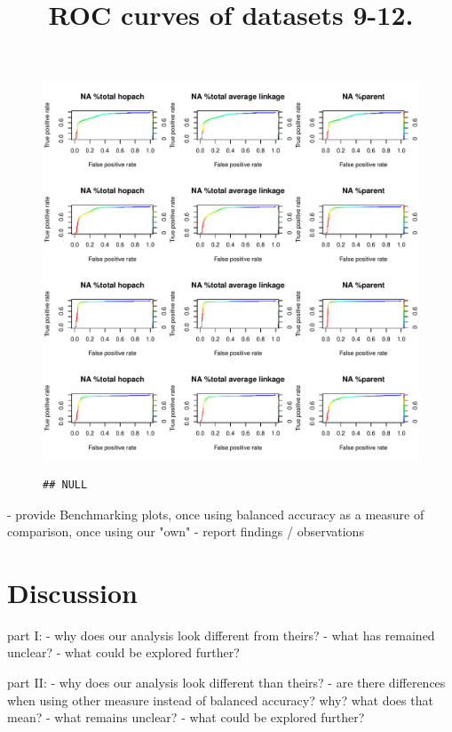 \documentclass[11pt,a4paper,twoside]{report}\usepackage[]{graphicx}\usepackage[]{color}
\makeatletter
\def\maxwidth{ %
  \ifdim\Gin@nat@width>\linewidth
    \linewidth
  \else
    \Gin@nat@width
  \fi
}
\newenvironment{kframe}{%
 \def\at@end@of@kframe{}%
 \ifinner\ifhmode%
  \def\at@end@of@kframe{\end{minipage}}%
  \begin{minipage}{\columnwidth}%
 \fi\fi%
 \def\FrameCommand##1{\hskip\@totalleftmargin \hskip-\fboxsep
 \colorbox{shadecolor}{##1}\hskip-\fboxsep
     \hskip-\linewidth \hskip-\@totalleftmargin \hskip\columnwidth}%
 \MakeFramed {\advance\hsize-\width
   \@totalleftmargin\z@ \linewidth\hsize
   \@setminipage}}%
 {\par\unskip\endMakeFramed%
 \at@end@of@kframe}
\newenvironment{knitrout}{}{} %
\makeatother
\begin{document}
\begin{figure}
\begin{knitrout}
\includegraphics[width=\maxwidth]{figure/unnamed-chunk-3-3} 
\begin{kframe}\begin{verbatim}
## NULL
\end{verbatim}
\end{kframe}
\end{knitrout}
\title{ROC curves of datasets 9-12.\label{fig:3}}
\end{figure}


- provide Benchmarking plots, once using balanced accuracy as a measure of comparison, once using our "own"
- report findings / observations




% 
\chapter{Discussion}\label{sec:discussion}

part I:
- why does our analysis look different from theirs?
- what has remained unclear?
- what could be explored further?

part II: 
- why does our analysis look different than theirs?
- are there differences when using other measure instead of balanced accuracy? why? what does that mean?
- what remains unclear?
- what could be explored further?
\end{document}
